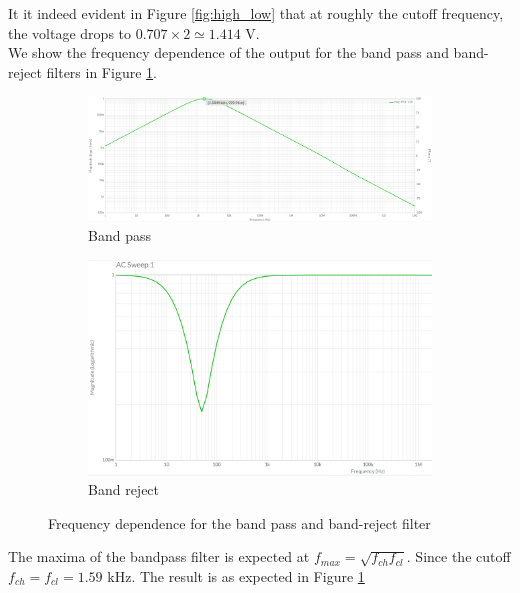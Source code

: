 \documentclass{article}
\begin{document}
	It it indeed evident in Figure \ref{fig:high_low} that at roughly the cutoff frequency, the voltage drops to $0.707\times 2 \simeq 1.414$ V.\\
	
	We show the frequency dependence of the output for the band pass and band-reject filters in Figure \ref{pass_reject}.
	
	\begin{figure}
		\centering
		\begin{subfigure}{0.8\textwidth}
			\includegraphics[width=\textwidth]{band_pass_response}
			\caption{Band pass}
		\end{subfigure}	
	
		\begin{subfigure}{0.7\textwidth}
			\includegraphics[width=\textwidth]{band_reject_response}
			\caption{Band reject}
		\end{subfigure}
		\caption{Frequency dependence for the band pass and band-reject filter}
		\label{pass_reject}
	\end{figure}

	The maxima of the bandpass filter is expected at $f_{max} = \sqrt{f_{ch}f_{cl}}$. Since the cutoff $f_{ch} = f_{cl} = 1.59$ kHz. The result is as expected in Figure \ref{pass_reject}
	
	
\end{document}
